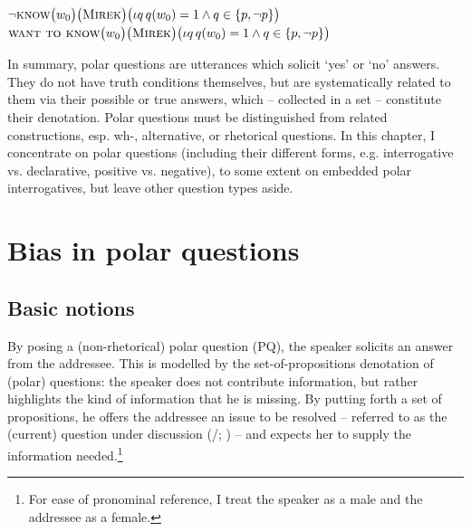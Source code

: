 \documentclass[output=paper,colorlinks,citecolor=brown]{langscibook}
\begin{document}
\ea \label{sim:denot-ei}\ea$\neg\textsc{know}\big(w_0\big)\big(\textsc{Mirek}\big)\big(\iota q\,q(w_0)=1\wedge q\in\{p,\neg p\}\big)$\label{sim:denot-ei-a}
\ex$\textsc{want to know}\big(w_0\big)\big(\textsc{Mirek}\big)\big(\iota q\,q(w_0)=1\wedge q\in\{p,\neg p\}\big)$\label{sim:denot-ei-b}
\z\z

\noindent In summary, polar questions are utterances which solicit `yes' or `no' answers. They do not have truth conditions themselves, but are systematically related to them via their possible or true answers, which -- collected in a set -- constitute their denotation. Polar questions must be distinguished from related constructions, esp. wh-, alternative, or rhetorical questions. In this chapter, I concentrate on polar questions (including their different forms, e.g. interrogative vs. declarative, positive vs. negative), to some extent on embedded polar interrogatives, but leave other question types aside.

\section{Bias in polar questions}\label{sim:sec:bias}

\subsection{Basic notions}\label{sim:sec:bias-basic}

By posing a (non-rhetorical) polar question (PQ), the speaker solicits an answer from the addressee. This is modelled by the set-of-propositions denotation of (polar) questions: the speaker does not contribute information, but rather highlights the kind of information that he is missing. By putting forth a set of propositions, he offers the addressee an issue to be resolved -- referred to as the (current) question under discussion (\citealt{Roberts1996}/\citeyear{Roberts2012}; \citealt{Farkas.Bruce2010}) -- and expects her to supply the information needed.\footnote{For ease of pronominal reference, I treat the speaker as a male and the addressee as a female.}
\end{document}
